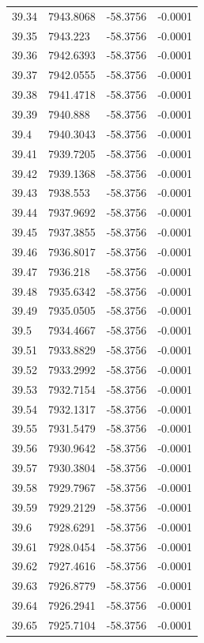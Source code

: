 \begin{table}[H]
\begin{tabular}{llll}
39.34 & 7943.8068 & -58.3756 & -0.0001 \\
39.35 & 7943.223 & -58.3756 & -0.0001 \\
39.36 & 7942.6393 & -58.3756 & -0.0001 \\
39.37 & 7942.0555 & -58.3756 & -0.0001 \\
39.38 & 7941.4718 & -58.3756 & -0.0001 \\
39.39 & 7940.888 & -58.3756 & -0.0001 \\
39.4 & 7940.3043 & -58.3756 & -0.0001 \\
39.41 & 7939.7205 & -58.3756 & -0.0001 \\
39.42 & 7939.1368 & -58.3756 & -0.0001 \\
39.43 & 7938.553 & -58.3756 & -0.0001 \\
39.44 & 7937.9692 & -58.3756 & -0.0001 \\
39.45 & 7937.3855 & -58.3756 & -0.0001 \\
39.46 & 7936.8017 & -58.3756 & -0.0001 \\
39.47 & 7936.218 & -58.3756 & -0.0001 \\
39.48 & 7935.6342 & -58.3756 & -0.0001 \\
39.49 & 7935.0505 & -58.3756 & -0.0001 \\
39.5 & 7934.4667 & -58.3756 & -0.0001 \\
39.51 & 7933.8829 & -58.3756 & -0.0001 \\
39.52 & 7933.2992 & -58.3756 & -0.0001 \\
39.53 & 7932.7154 & -58.3756 & -0.0001 \\
39.54 & 7932.1317 & -58.3756 & -0.0001 \\
39.55 & 7931.5479 & -58.3756 & -0.0001 \\
39.56 & 7930.9642 & -58.3756 & -0.0001 \\
39.57 & 7930.3804 & -58.3756 & -0.0001 \\
39.58 & 7929.7967 & -58.3756 & -0.0001 \\
39.59 & 7929.2129 & -58.3756 & -0.0001 \\
39.6 & 7928.6291 & -58.3756 & -0.0001 \\
39.61 & 7928.0454 & -58.3756 & -0.0001 \\
39.62 & 7927.4616 & -58.3756 & -0.0001 \\
39.63 & 7926.8779 & -58.3756 & -0.0001 \\
39.64 & 7926.2941 & -58.3756 & -0.0001 \\
39.65 & 7925.7104 & -58.3756 & -0.0001 \\

\end{tabular}
\end{table}
